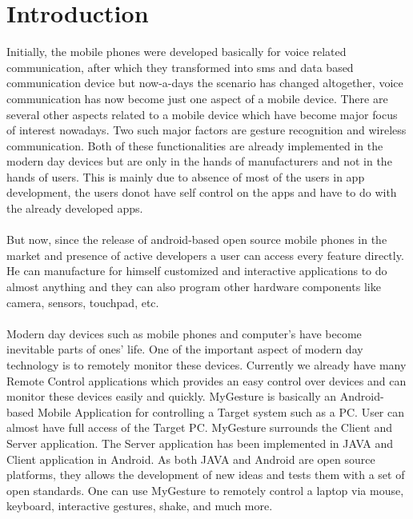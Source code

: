 \documentclass[10pt,conference,letterpaper]{IEEEtran}
\begin{document}
\section{Introduction}
Initially, the mobile phones were developed basically for voice related communication, after which they transformed into sms and data based communication device but now-a-days the scenario has changed altogether, voice communication has now become just one aspect of a mobile device. There are several other aspects related to a mobile device which have become major focus of interest nowadays. Two such major factors are gesture recognition and wireless communication. Both of these functionalities are already implemented in the modern day devices but are only in the hands of manufacturers  and not in the hands of users. This is mainly due to absence of most of the users in app development, the users donot have self control on the apps and have to do with the already developed apps. \\\\
But now, since the release of android-based open source mobile phones in the market and presence of active developers a user can access every feature directly. He can manufacture for himself customized and interactive applications to do almost anything and they can  also program other hardware components like camera, sensors, touchpad, etc.\\\\
Modern day devices such as mobile phones and computer’s have become inevitable parts of ones’ life. One of the important aspect of modern day technology is to remotely monitor these devices. Currently we already have many Remote Control applications which provides an easy control over devices and can monitor these devices easily and quickly.  MyGesture is basically an Android-based Mobile Application for controlling a Target system such as a PC. User can almost have full access of the Target PC. MyGesture surrounds the Client and Server application. The Server application has been implemented in JAVA and Client application in Android. As both JAVA and Android are open source platforms, they allows the development of new ideas and tests them with a set of open standards. One can use MyGesture to remotely control a laptop via mouse, keyboard, interactive gestures, shake, and much more.\\\\
\end{document}

